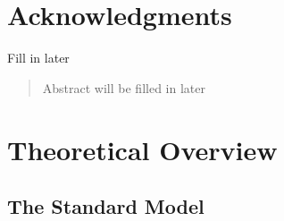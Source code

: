 \documentclass{umassthesis}          %
\begin{document}
\chapter{Acknowledgments}             %
  Fill in later

\begin{abstract}                %
    Abstract will be filled in later
\end{abstract}



\tableofcontents                %
\listoftables                   %
\listoffigures                  %


\mainmatter{}   %

\label{ch:introduction}


% 

\chapter{Theoretical Overview}\label{ch:theory}

\section{The Standard Model}\label{sec:theory_sm}

% 
\end{document}

